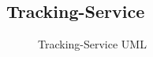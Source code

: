 \subsection{Tracking-Service}
\begin{figure}[!ht]
    \centering
    \caption{Tracking-Service UML}
    \label{fig:tracking-service}
\end{figure}
